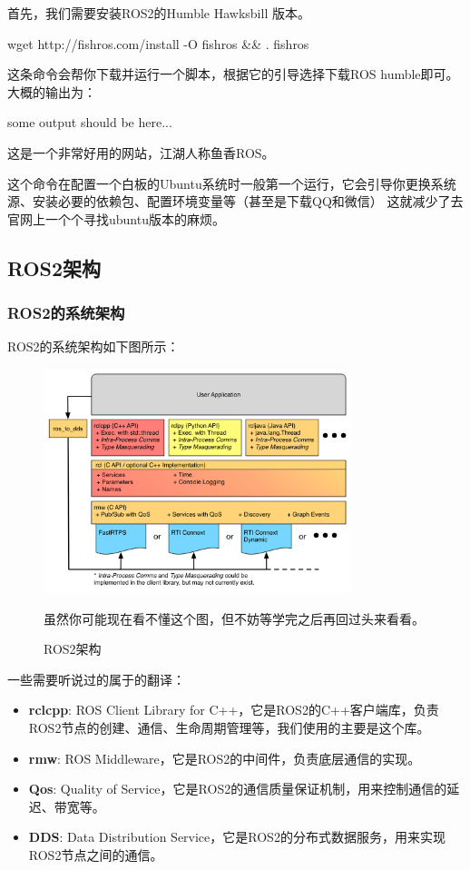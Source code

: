 首先，我们需要安装ROS2的Humble Hawksbill 版本。
\begin{tbash}
    wget http://fishros.com/install -O fishros && . fishros
\end{tbash}
这条命令会帮你下载并运行一个脚本，根据它的引导选择下载ROS humble即可。
大概的输出为：
\begin{tbash}
    some output should be here...
\end{tbash}
这是一个非常好用的网站，江湖人称鱼香ROS。

这个命令在配置一个白板的Ubuntu系统时一般第一个运行，它会引导你更换系统源、安装必要的依赖包、配置环境变量等（甚至是下载QQ和微信）
这就减少了去官网上一个个寻找ubuntu版本的麻烦。

\subsection{ROS2架构}
\subsubsection{ROS2的系统架构}
ROS2的系统架构如下图所示：
\begin{figure}[h]
    \centering
    \includegraphics[width=0.8\textwidth]{Chapter4/img/ros2_arch.png}
    \caption{ROS2架构}
    \label{fig:ros2_arch}
    虽然你可能现在看不懂这个图，但不妨等学完之后再回过头来看看。
\end{figure}
一些需要听说过的属于的翻译：
\begin{itemize}
    \item \textbf{rclcpp}: ROS Client Library for C++，它是ROS2的C++客户端库，负责ROS2节点的创建、通信、生命周期管理等，我们使用的主要是这个库。
    \item \textbf{rmw}: ROS Middleware，它是ROS2的中间件，负责底层通信的实现。
    \item \textbf{Qos}: Quality of Service，它是ROS2的通信质量保证机制，用来控制通信的延迟、带宽等。
    \item \textbf{DDS}: Data Distribution Service，它是ROS2的分布式数据服务，用来实现ROS2节点之间的通信。
\end{itemize}
